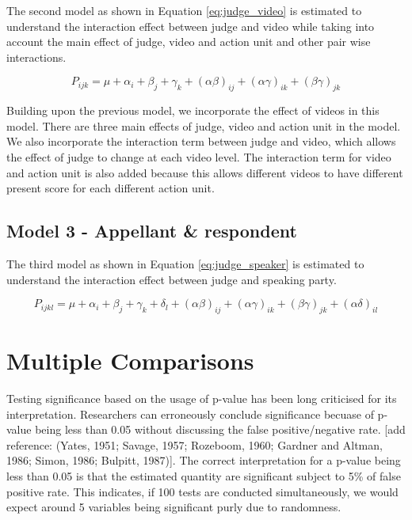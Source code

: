 \documentclass{monashthesis}
\begin{document}
The second model as shown in Equation \ref{eq:judge_video} is estimated to understand the interaction effect between judge and video while taking into account the main effect of judge, video and action unit and other pair wise interactions.

\begin{equation}\label{eq:judge_video}
P_{ijk} = \mu + \alpha_i + \beta_j +\gamma_k + (\alpha\beta)_{ij} + (\alpha\gamma)_{ik} + (\beta\gamma)_{jk}
\end{equation}

Building upon the previous model, we incorporate the effect of videos in this model. There are three main effects of judge, video and action unit in the model. We also incorporate the interaction term between judge and video, which allows the effect of judge to change at each video level. The interaction term for video and action unit is also added because this allows different videos to have different present score for each different action unit.

\hypertarget{model-3---appellant-respondent}{%
\subsection{Model 3 - Appellant \& respondent}\label{model-3---appellant-respondent}}

The third model as shown in Equation \ref{eq:judge_speaker} is estimated to understand the interaction effect between judge and speaking party.

\begin{equation}\label{eq:judge_speaker}
P_{ijkl} = \mu + \alpha_i + \beta_j +\gamma_k + \delta_l + (\alpha\beta)_{ij} + (\alpha\gamma)_{ik} + (\beta\gamma)_{jk} + (\alpha\delta)_{il}
\end{equation}

\hypertarget{multiple-comparisons}{%
\section{Multiple Comparisons}\label{multiple-comparisons}}

Testing significance based on the usage of p-value has been long criticised for its interpretation. Researchers can erroneously conclude significance becuase of p-value being less than 0.05 without discussing the false positive/negative rate. {[}add reference: (Yates, 1951; Savage, 1957; Rozeboom, 1960; Gardner and Altman, 1986; Simon, 1986; Bulpitt, 1987){]}. The correct interpretation for a p-value being less than 0.05 is that the estimated quantity are significant subject to 5\% of false positive rate. This indicates,
if 100 tests are conducted simultaneously, we would expect around 5 variables being significant purly due to randomness.
\end{document}
